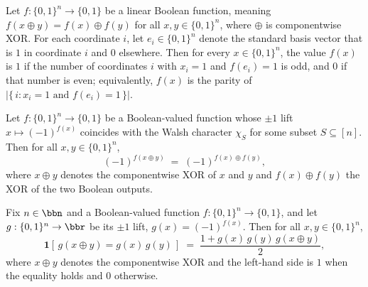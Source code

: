 \begin{lemma}
\label{BoolBLR.linear_bool_iff_character_aux_h_fx}
\leanok
{}
Let $f : \{0,1\}^n \to \{0,1\}$ be a linear Boolean function, meaning $f(x \oplus y) =
f(x) \oplus f(y)$ for all $x, y \in \{0,1\}^n$, where $\oplus$ is componentwise XOR. For
each coordinate $i$, let $e_i \in \{0,1\}^n$ denote the standard basis vector that is
$1$ in coordinate $i$ and $0$ elsewhere. Then for every $x \in \{0,1\}^n$, the value
$f(x)$ is $1$ if the number of coordinates $i$ with $x_i = 1$ and $f(e_i) = 1$ is odd,
and $0$ if that number is even; equivalently, $f(x)$ is the parity of $\lvert\{\, i :
x_i = 1 \text{ and } f(e_i) = 1 \,\}\rvert$.
\end{lemma}

\begin{lemma}
\label{BoolBLR.linear_bool_iff_character_aux_h_eq_h}
\leanok
{}
Let $f : \{0,1\}^n \to \{0,1\}$ be a Boolean-valued function whose $\pm 1$ lift $x
\mapsto (-1)^{f(x)}$ coincides with the Walsh character $\chi_S$ for some subset $S
\subseteq [n]$. Then for all $x, y \in \{0,1\}^n$,
\[
  (-1)^{f(x \oplus y)} \;=\; (-1)^{f(x) \oplus f(y)},
\]
where $x \oplus y$ denotes the componentwise XOR of $x$ and $y$ and $f(x) \oplus f(y)$
the XOR of the two Boolean outputs.
\end{lemma}

\begin{lemma}
\label{BoolBLR.BLR_accept_prob_pm1_aux_h_eq}
\leanok
{}
Fix $n \in \bbn$ and a Boolean-valued function $f : \{0,1\}^n \to \{0,1\}$, and let $g :
\{0,1\}^n \to \bbr$ be its $\pm 1$ lift, $g(x) = (-1)^{f(x)}$. Then for all $x, y \in
\{0,1\}^n$,
\[
  \mathbf{1}\!\left[\, g(x \oplus y) = g(x)\,g(y) \,\right]
  \;=\;
  \frac{1 + g(x)\,g(y)\,g(x \oplus y)}{2},
\]
where $x \oplus y$ denotes the componentwise XOR and the left-hand side is $1$ when the
equality holds and $0$ otherwise.
\end{lemma}


